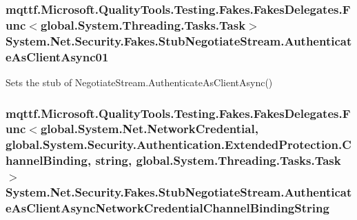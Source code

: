 \hypertarget{class_system_1_1_net_1_1_security_1_1_fakes_1_1_stub_negotiate_stream_abe8d4d20d6d5aeac9bffea28135ec31c}{
\subsubsection[{Authenticate\-As\-Client\-Async01}]{\setlength{\rightskip}{0pt plus 5cm}mqttf.\-Microsoft.\-Quality\-Tools.\-Testing.\-Fakes.\-Fakes\-Delegates.\-Func$<$global.\-System.\-Threading.\-Tasks.\-Task$>$ System.\-Net.\-Security.\-Fakes.\-Stub\-Negotiate\-Stream.\-Authenticate\-As\-Client\-Async01}}\label{class_system_1_1_net_1_1_security_1_1_fakes_1_1_stub_negotiate_stream_abe8d4d20d6d5aeac9bffea28135ec31c}


Sets the stub of Negotiate\-Stream.\-Authenticate\-As\-Client\-Async()

\hypertarget{class_system_1_1_net_1_1_security_1_1_fakes_1_1_stub_negotiate_stream_af793479ab248b1e565e43f0ea5341306}{
\subsubsection[{Authenticate\-As\-Client\-Async\-Network\-Credential\-Channel\-Binding\-String}]{\setlength{\rightskip}{0pt plus 5cm}mqttf.\-Microsoft.\-Quality\-Tools.\-Testing.\-Fakes.\-Fakes\-Delegates.\-Func$<$global.\-System.\-Net.\-Network\-Credential, global.\-System.\-Security.\-Authentication.\-Extended\-Protection.\-Channel\-Binding, string, global.\-System.\-Threading.\-Tasks.\-Task$>$ System.\-Net.\-Security.\-Fakes.\-Stub\-Negotiate\-Stream.\-Authenticate\-As\-Client\-Async\-Network\-Credential\-Channel\-Binding\-String}}\label{class_system_1_1_net_1_1_security_1_1_fakes_1_1_stub_negotiate_stream_af793479ab248b1e565e43f0ea5341306}


